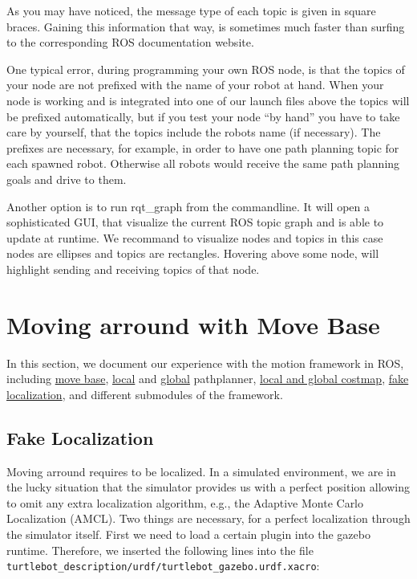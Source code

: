 As you may have noticed, the message type of each topic is given in square braces. Gaining this information that way, is sometimes much faster than surfing to the corresponding ROS documentation website.

One typical error, during programming your own ROS node, is that the topics of your node are not prefixed with the name of your robot at hand. When your node is working and is integrated into one of our launch files above the topics will be prefixed automatically, but if you test your node ``by hand'' you have to take care by yourself, that the topics include the robots name (if necessary). The prefixes are necessary, for example, in order to have one path planning topic for each spawned robot. Otherwise all robots would receive the same path planning goals and drive to them. 

Another option is to run rqt\_graph from the commandline. It will open a sophisticated GUI, that visualize the current ROS topic graph and is able to update at runtime. We recommand to visualize nodes and topics \textendash in this case nodes are ellipses and topics are rectangles. Hovering above some node, will highlight sending and receiving topics of that node.

\section{Moving arround with Move Base}
\label{sec:MovingWithMoveBase}

In this section, we document our experience with the motion framework in ROS, including \href{http://wiki.ros.org/move_base}{move base}, \href{http://wiki.ros.org/dwa_local_planner}{local} and \href{http://wiki.ros.org/global_planner}{global} pathplanner, \href{http://wiki.ros.org/costmap_2d}{local and global costmap}, \href{http://wiki.ros.org/fake_localization}{fake localization}, and different submodules of the framework.

\subsection{Fake Localization}
\label{ssec:FakeLocalization}

Moving arround requires to be localized. In a simulated environment, we are in the lucky situation that the simulator provides us with a perfect position allowing to omit any extra localization algorithm, e.g., the Adaptive Monte Carlo Localization (AMCL). Two things are necessary, for a perfect localization through the simulator itself. First we need to load a certain plugin into the gazebo runtime. Therefore, we inserted the following lines into the file \verb$turtlebot_description/urdf/turtlebot_gazebo.urdf.xacro$:

